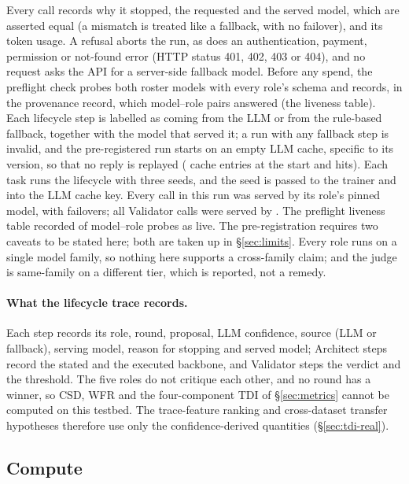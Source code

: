 Every call records why it stopped, the requested and the served model, which are asserted
equal (a mismatch is treated like a fallback, with no failover), and its token usage. A
refusal aborts the run, as does an authentication, payment, permission or not-found error
(HTTP status 401, 402, 403 or 404), and no request asks the API for a server-side fallback model.
Before any spend, the preflight check probes both roster models with every role's schema and
records, in the provenance record, which model--role pairs answered (the liveness table). Each lifecycle step is labelled as coming from the LLM or
from the rule-based fallback, together with the model that served it; a run with any fallback
step is invalid, and the pre-registered run starts on an empty LLM cache, specific to its
version, so that no reply is replayed (\resCacheStart{} cache entries at the start and
\resCacheHits{} hits). Each task runs the lifecycle with three seeds, and the seed is passed to
the trainer and into the LLM cache key. Every call in this run was served by its role's pinned
model, with \resNFailover{} failovers; all \resRoleCallsValidator{} Validator calls were served
by \resRoleServedValidator. The preflight liveness table recorded \resLivenessOkPairs{} of
\resLivenessTotalPairs{} model--role probes as live. The pre-registration requires two caveats
to be stated here; both are taken up in \S\ref{sec:limits}. Every role runs on a
single model family, so nothing here supports a cross-family claim; and the judge is same-family on a
different tier, which is reported, not a remedy.

\paragraph{What the lifecycle trace records.} Each step records its role, round, proposal, LLM
confidence, source (LLM or fallback), serving model, reason for stopping and served model;
Architect steps record the stated and the executed backbone, and Validator steps the verdict
and the threshold. The five roles do not critique each other, and no round has a winner, so
CSD, WFR and the four-component TDI of \S\ref{sec:metrics} cannot be computed on this testbed.
The trace-feature ranking and cross-dataset transfer hypotheses therefore use only the
confidence-derived quantities (\S\ref{sec:tdi-real}).

\subsection{Compute}\label{subsec:compute}

